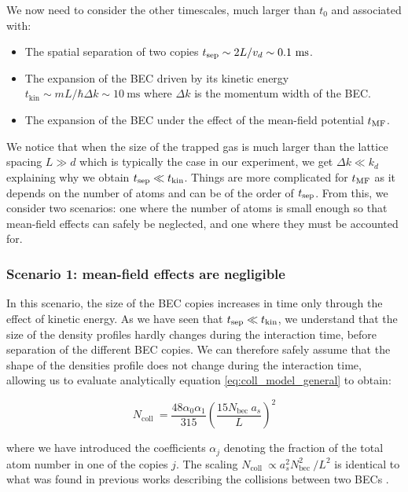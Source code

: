 We now need to consider the other timescales, much larger than $t_0$ and associated with:

\begin{itemize}
    \item The spatial separation of two copies $t_{\rm{sep}} \sim 2L/v_d \sim 0.1 \ \rm{ms}$.
    \item The expansion of the BEC driven by its kinetic energy $t_{\mathrm{kin}} \sim m L / \hbar \Delta k \sim 10 \mathrm{~ms}$ where $\Delta k$ is the momentum width of the BEC.
    \item The expansion of the BEC under the effect of the mean-field potential $t_{\rm{MF}}$.
\end{itemize}

\noindent We notice that when the size of the trapped gas is much larger than the lattice spacing $L \gg d$ which is typically the case in our experiment, we get $\Delta k \ll k_d$ explaining why we obtain $t_{\rm{sep}} \ll t_{\rm{kin}}$. Things are more complicated for $t_{\rm{MF}}$ as it depends on the number of atoms and can be of the order of $t_{\rm{sep}}$. From this, we consider two scenarios: one where the number of atoms is small enough so that mean-field effects can safely be neglected, and one where they must be accounted for.

\subsubsection{Scenario 1: mean-field effects are negligible}

In this scenario, the size of the BEC copies increases in time only through the effect of kinetic energy. As we have seen that $t_{\rm{sep}} \ll t_{\rm{kin}}$, we understand that the size of the density profiles hardly changes during the interaction time, \ie before separation of the different BEC copies. We can therefore safely assume that the shape of the densities profile does not change during the interaction time, allowing us to evaluate analytically equation \ref{eq:coll_model_general} to obtain:

\begin{equation}
    N_{\text {coll }}=\frac{48 \alpha_{0} \alpha_{1}}{315}\left(\frac{15 N_{\text {bec }} a_{s}}{L}\right)^{2}
    \label{eq:analytical_model}
\end{equation}

\noindent where we have introduced the coefficients $\alpha_j$ denoting the fraction of the total atom number in one of the copies $j$. The scaling $N_{\text {coll }} \propto a_{s}^{2} N_{\text {bec }}^{2} / L^{2}$ is identical to what was found in previous works describing the collisions between two BECs \cite{zin2005quantum,zin2006elastic}. 

